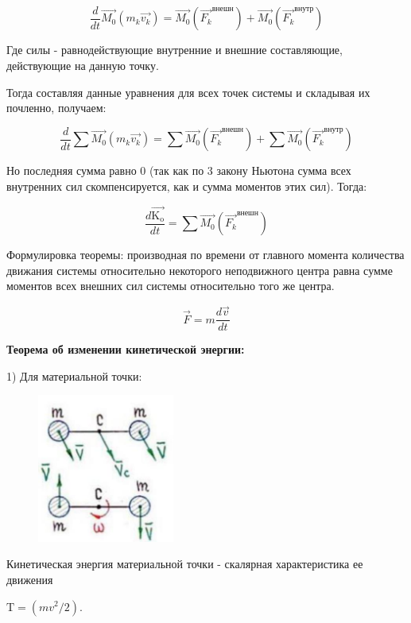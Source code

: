 $$
\frac{d}{d t} \overrightarrow{M_{0}}\left(m_{k} \overrightarrow{v_{k}}\right)=\overrightarrow{M_{0}}\left(\Vec{F_{k}}^{\text{внешн}}\right)+\overrightarrow{M_{0}}\left(\vec{F_{k}}^{\text{внутр}}\right)
$$

Где силы - равнодействующие внутренние и внешние составляющие, действующие на данную точку.

Тогда составляя данные уравнения для всех точек системы и складывая их почленно, получаем:

$$
\frac{d}{d t} \sum \overrightarrow{M_{0}}\left(m_{k} \overrightarrow{v_{k}}\right)=\sum \overrightarrow{M_{0}}\left(\Vec{F_{k}}^{\text{внешн}}\right)+\sum \overrightarrow{M_{0}}\left(\vec{F_{k}}^{\text{внутр}}\right)
$$

Но последняя сумма равно 0 (так как по 3 закону Ньютона сумма всех внутренних сил скомпенсируется, как и сумма моментов этих сил). Тогда:

$$
\frac{d \overrightarrow{\mathrm{K}_{\mathrm{o}}}}{d t}=\sum \overrightarrow{M_{0}}\left(\Vec{F_{k}}^{\text{внешн}}\right)
$$

Формулировка теоремы: производная по времени от главного момента количества движания системы относительно некоторого неподвижного центра равна сумме моментов всех внешних сил системы относительно того же центра.

$$
\vec{F}=m \frac{d \vec{v}}{d t}
$$

\textbf{Теорема об изменении кинетической энергии:}


1) Для материальной точки:


\begin{figure}[h!]
    \centering
    \includegraphics[width=0.4\textwidth]{2023_05_21_6e9b4e8657e82b213c6ag-06}
\end{figure}
Кинетическая энергия материальной точки - скалярная характеристика ее движения

$\mathrm{T}=\left(mv^{2} / 2\right)$.

